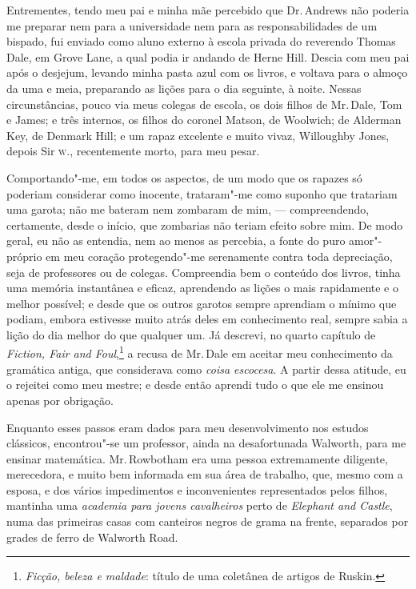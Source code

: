 Entrementes, tendo meu pai e minha mãe percebido que Dr.\,Andrews não
poderia me preparar nem para a universidade nem para as
responsabilidades de um bispado, fui enviado como aluno externo à escola
privada do reverendo Thomas Dale, em Grove Lane, a qual podia ir andando
de Herne Hill. Descia com meu pai após o desjejum, levando minha pasta
azul com os livros, e voltava para o almoço da uma e meia, preparando as
lições para o dia seguinte, à noite. Nessas circunstâncias, pouco via
meus colegas de escola, os dois filhos de Mr.\,Dale, Tom e James; e três
internos, os filhos do coronel Matson, de Woolwich; de Alderman Key, de
Denmark Hill; e um rapaz excelente e muito vivaz, Willoughby Jones,
depois Sir \textsc{w}., recentemente morto, para meu pesar.

Comportando"-me, em todos os aspectos, de um modo que os rapazes só
poderiam considerar como inocente, trataram"-me como suponho que
tratariam uma garota; não me bateram nem zombaram de mim, ---
compreendendo, certamente, desde o início, que zombarias não teriam
efeito sobre mim. De modo geral, eu não as entendia, nem ao menos as
percebia, a fonte do puro amor"-próprio em meu coração protegendo"-me
serenamente contra toda depreciação, seja de professores ou de colegas.
Compreendia bem o conteúdo dos livros, tinha uma memória instantânea e
eficaz, aprendendo as lições o mais rapidamente e o melhor possível; e
desde que os outros garotos sempre aprendiam o mínimo que podiam, embora
estivesse muito atrás deles em conhecimento real, sempre sabia a lição
do dia melhor do que qualquer um. Já descrevi, no quarto capítulo de
\textit{Fiction, Fair and Foul},\footnote{\textit{Ficção, beleza e maldade}:
  título de uma coletânea de artigos de Ruskin.} a
recusa de Mr.\,Dale em aceitar meu conhecimento da gramática antiga, que
considerava como \textit{coisa escocesa}. A partir dessa atitude, eu o
rejeitei como meu mestre; e desde então aprendi tudo o que ele me
ensinou apenas por obrigação.

Enquanto esses passos eram dados para meu desenvolvimento nos
estudos clássicos, encontrou"-se um professor, ainda na desafortunada
Walworth, para me ensinar matemática. Mr.\,Rowbotham era uma pessoa
extremamente diligente, merecedora, e muito bem informada em sua área de
trabalho, que, mesmo com a esposa, e dos vários impedimentos e
inconvenientes representados pelos filhos, mantinha uma \textit{academia para
jovens cavalheiros} perto de \textit{Elephant and Castle}, numa das
primeiras casas com canteiros negros de grama na frente, separados por
grades de ferro de Walworth Road.

